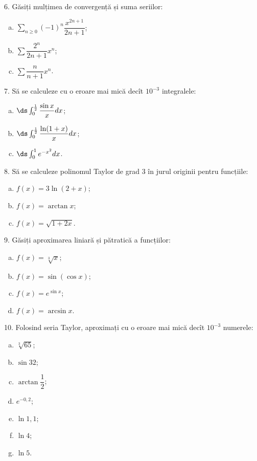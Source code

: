 \vspace{1cm}

6. Găsiți mulțimea de convergență și suma seriilor:
\begin{enumerate}[(a)]
\item $ \sum_{n \geq 0} (-1)^n \dfrac{x^{2n+1}}{2n + 1} $;
\item $ \sum \dfrac{2^n}{2n + 1} x^n $;
\item $ \sum \dfrac{n}{n + 1} x^n $.
\end{enumerate}

\vspace{1cm}

7. Să se calculeze cu o eroare mai mică decît $ 10^{-3}$ integralele:
\begin{enumerate}[(a)]
\item $ \ds\int_0^{\frac{1}{2}} \dfrac{\sin x}{x} dx $;
\item $ \ds\int_0^{\frac{1}{2}} \dfrac{\ln(1 + x)}{x} dx $;
\item $ \ds\int_0^1 e^{-x^2} dx $.
\end{enumerate}

\vspace{1cm}

8. Să se calculeze polinomul Taylor de grad 3 în jurul originii
pentru funcțiile:
\begin{enumerate}[(a)]
\item $ f(x) = 3 \ln(2 + x) $;
\item $ f(x) = \arctan x $;
\item $ f(x) = \sqrt{1 + 2x} $.
\end{enumerate}

\vspace{1cm}

9. Găsiți aproximarea liniară și pătratică a funcțiilor:
\begin{enumerate}[(a)]
\item $ f(x) = \sqrt[3]{x} $;
\item $ f(x) = \sin(\cos x) $;
\item $ f(x) = e^{\sin x} $;
\item $ f(x) = \arcsin x $.
\end{enumerate}

\vspace{1cm}

10. Folosind seria Taylor, aproximați cu o eroare mai mică decît $ 10^{-3} $
numerele:
\begin{enumerate}[(a)]
\item $ \sqrt[3]{65} $;
\item $ \sin 32 $;
\item $ \arctan \dfrac{1}{2} $;
\item $ e^{-0,2} $;
\item $ \ln 1,1 $;
\item $ \ln 4 $;
\item $ \ln 5 $.
\end{enumerate}

